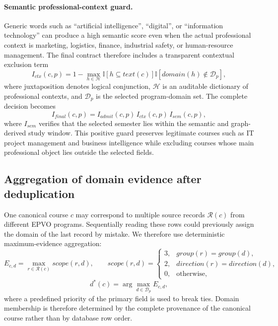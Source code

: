 \documentclass[twoside,11pt]{article}
\begin{document}
\paragraph{Semantic professional-context guard.}
Generic words such as ``artificial intelligence'', ``digital'', or ``information technology'' can produce a high semantic score even when the actual professional context is marketing, logistics, finance, industrial safety, or human-resource management. The final contract therefore includes a transparent contextual exclusion term
\begin{equation}
I_{ctx}(c,p)=
1-\max_{h\in\mathcal{H}}
\mathbb{I}[h\subseteq text(c)]
\mathbb{I}[domain(h)\notin\mathcal{D}_p],
\label{eq:context-guard}
\end{equation}
where juxtaposition denotes logical conjunction, $\mathcal{H}$ is an auditable dictionary of professional contexts, and $\mathcal{D}_p$ is the selected program-domain set. The complete decision becomes
\begin{equation}
I_{final}(c,p)=I_{admit}(c,p)\,I_{ctx}(c,p)\,I_{sem}(c,p),
\label{eq:final-admission}
\end{equation}
where $I_{sem}$ verifies that the selected semester lies within the semantic and graph-derived study window. This positive guard preserves legitimate courses such as IT project management and business intelligence while excluding courses whose main professional object lies outside the selected fields.

\subsection{Aggregation of domain evidence after deduplication}

One canonical course $c$ may correspond to multiple source records $\mathcal{R}(c)$ from different EPVO programs. Sequentially reading these rows could previously assign the domain of the last record by mistake. We therefore use deterministic maximum-evidence aggregation:
\begin{equation}
E_{c,d}=\max_{r\in\mathcal{R}(c)} scope(r,d),\qquad
scope(r,d)=
\begin{cases}
3,& group(r)=group(d),\\
2,& direction(r)=direction(d),\\
0,& \text{otherwise},
\end{cases}
\label{eq:domain-evidence}
\end{equation}
\begin{equation}
d^{\ast}(c)=\arg\max_{d\in\mathcal{D}_p}E_{c,d},
\label{eq:domain-assignment}
\end{equation}
where a predefined priority of the primary field is used to break ties. Domain membership is therefore determined by the complete provenance of the canonical course rather than by database row order.
\end{document}

